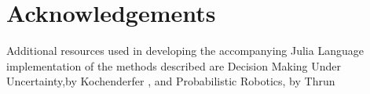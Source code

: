 \section{Acknowledgements}
Additional resources used in developing the accompanying Julia Language implementation of the methods described are Decision Making Under Uncertainty,by Kochenderfer \cite{Kochenderfer2014}, and Probabilistic Robotics, by Thrun \cite{Thrun:2005:PR:1121596}
